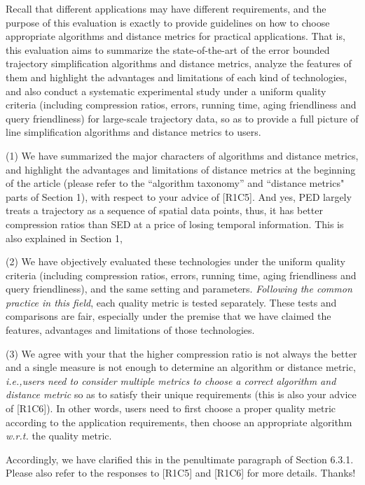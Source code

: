 \documentclass{letter}
\newcommand{\ie}{\emph{i.e.,}\xspace}
\newcommand{\wrt}{\emph{w.r.t.}\xspace}
\begin{document}
Recall that different applications may have different requirements, and the purpose of this evaluation is exactly to
provide guidelines on how to choose appropriate algorithms and distance metrics for practical applications.
That is, this evaluation aims to summarize the state-of-the-art of the error bounded trajectory simplification algorithms and distance metrics, analyze the features of them and highlight the advantages and limitations of each kind of technologies, and also conduct a systematic experimental study under a uniform quality criteria (including compression ratios, errors, running time, aging friendliness and query friendliness) for large-scale trajectory data, so as to provide a full picture of line simplification algorithms and distance metrics to users.

(1) We have summarized the major characters of algorithms and distance metrics, and highlight the advantages and limitations of distance metrics at the beginning of the article (please refer to the ``algorithm taxonomy'' and ``distance metrics" parts of Section 1), with respect to your advice of [R1C5]. And yes, PED largely treats a trajectory as a sequence of spatial data points, thus, it has better compression ratios than SED at a price of losing temporal information. This is also explained in Section 1,

(2) We have objectively evaluated these technologies under the uniform quality criteria (including compression ratios, errors, running time, aging friendliness and query friendliness), and the same setting and parameters. {\em Following the common practice in this field}, each quality metric is tested separately. These tests and comparisons are fair, especially under the premise that we have claimed the features, advantages and limitations of those technologies. %

(3) We agree with your that the higher compression ratio is not always the better and a single measure is not enough to determine an algorithm or distance metric, \ie \emph{users need to consider multiple metrics to choose a correct algorithm and distance metric} so as to satisfy their unique requirements (this is also your advice of [R1C6]). In other words, users need to first choose a proper quality metric according to the application requirements, then choose an appropriate algorithm \wrt the quality metric.

Accordingly, we have clarified this in the penultimate paragraph of Section 6.3.1. Please also refer to the responses to [R1C5] and [R1C6] for more details. Thanks!
\end{document}
